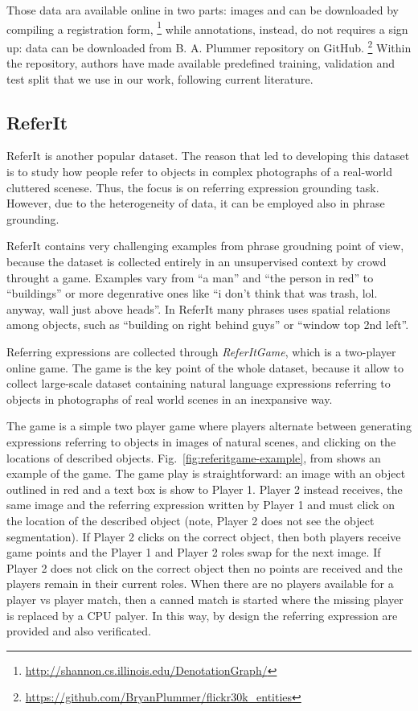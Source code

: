 Those data ara available online in two parts: images and can be
downloaded by compiling a registration form,
\footnote{\href{http://shannon.cs.illinois.edu/DenotationGraph/}{http://shannon.cs.illinois.edu/DenotationGraph/}}
while annotations, instead, do not requires a sign up: data can be
downloaded from B. A. Plummer repository on GitHub.
\footnote{\href{https://github.com/BryanPlummer/flickr30k\_entities}{https://github.com/BryanPlummer/flickr30k\_entities}}
Within the repository, authors have made available predefined
training, validation and test split that we use in our work, following
current literature.

\subsection{ReferIt}

ReferIt \cite{kazemzadeh2014referitgame} is another popular dataset.
The reason that led to developing this dataset is to study how people
refer to objects in complex photographs of a real-world cluttered
scenese. Thus, the focus is on referring expression grounding task.
However, due to the heterogeneity of data, it can be employed also in
phrase grounding.

ReferIt contains very challenging examples from phrase groudning point
of view, because the dataset is collected entirely in an unsupervised
context by crowd throught a game. Examples vary from ``a man'' and
``the person in red'' to ``buildings'' or more degenrative ones like
``i don't think that was trash, lol. anyway, wall just above heads''.
In ReferIt many phrases uses spatial relations among objects, such as
``building on right behind guys'' or ``window top 2nd left''.

Referring expressions are collected through \textit{ReferItGame},
which is a two-player online game. The game is the key point of the
whole dataset, because it allow to collect large-scale dataset
containing natural language expressions referring to objects in
photographs of real world scenes in an inexpansive way.

The game is a simple two player game where players alternate between
generating expressions referring to objects in images of natural
scenes, and clicking on the locations of described objects.
Fig.~\ref{fig:referitgame-example}, from
\cite{kazemzadeh2014referitgame} shows an example of the game. The
game play is straightforward: an image with an object outlined in red
and a text box is show to Player 1. Player 2 instead receives, the
same image and the referring expression written by Player 1 and must
click on the location of the described object (note, Player 2 does not
see the object segmentation). If Player 2 clicks on the correct
object, then both players receive game points and the Player 1 and
Player 2 roles swap for the next image. If Player 2 does not click on
the correct object then no points are received and the players remain
in their current roles. When there are no players available for a
player vs player match, then a canned match is started where the
missing player is replaced by a CPU palyer. In this way, by design the
referring expression are provided and also verificated. 

